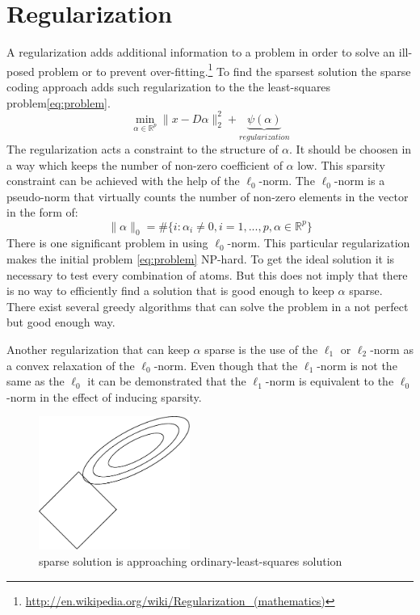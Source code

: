 \section{Regularization}
A regularization adds additional information to a problem in order to solve an
ill-posed problem or to prevent over-fitting.\footnote{\url{
http://en.wikipedia.org/wiki/Regularization_(mathematics)}}
To find the sparsest solution the sparse coding approach adds such
regularization to the the least-squares problem\ref{eq:problem}. 
\begin{equation}
\min_{\alpha\in\mathbb{R}^{p}} \lVert x - D\alpha \rVert^{2}_{2} +
\underbrace{\psi(\alpha)}_{regularization}
\end{equation}
The regularization acts a constraint to the structure of $\alpha$. It should be
choosen in a way which keeps the number of non-zero coefficient of $\alpha$ low.
This sparsity constraint can be achieved with the help of the $\ell_0$-norm.
The $\ell_0$-norm is a pseudo-norm that virtually counts the number of non-zero
elements in the vector in the form of:
\begin{equation}
\lVert\alpha\rVert_{0} = \#\{i:\alpha_i \neq 
0,i=1,...,p,\alpha\in\mathbb{R}^p\} 
\end{equation}
There is one significant problem in using $\ell_0$-norm. This particular
regularization makes the initial problem \ref{eq:problem} NP-hard. To get the
ideal solution it is necessary to test every combination of atoms. But this
does not imply that there is no way to efficiently find a solution that is good
enough to keep $\alpha$ sparse. There exist several greedy algorithms that can
solve the problem in a not perfect but good enough way. 

Another regularization that can keep $\alpha$ sparse is the use of the $\ell_1$
or $\ell_2$-norm as a convex relaxation of the $\ell_0$-norm. Even though that
the $\ell_1$-norm is not the same as the $\ell_0$ it can be demonstrated that
the $\ell_1$-norm is equivalent to the $\ell_0$-norm in the effect of inducing
sparsity.
\begin{figure}[h]
\centering
\includegraphics[width = 0.44\textwidth]{images/regularization.pdf}
\caption{sparse solution is approaching ordinary-least-squares solution}
\label{fig:sparse}
\end{figure}

